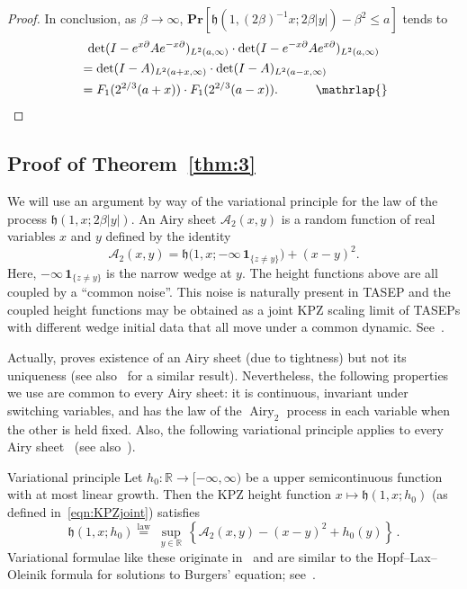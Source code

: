 \documentclass[AHL,Unicode,longabstracts]{cedram}
\DeclareMathOperator{\airy}{Airy}
\newcommand{\pr}[1]{\mathbf{Pr}\left[#1\right]}
\newcommand{\ind}[1]{\mathbf{1}_{\{ #1 \}}}
\newcommand{\R}{\mathbb{R}}
\newcommand{\A}{\mathcal{A}}
\newcommand{\h}{\mathfrak{h}}
\begin{document}
\begin{proof}
In conclusion, as $\beta \to \infty$, $\pr{\h(1,(2\beta)^{-1}x; 2\beta |y|) - \beta^2 \leq a}$ tends to
\begin{multline*}
\det(I - e^{x \partial} A e^{-x\partial})_{L^2(a,\infty)} \cdot \det(I - e^{-x \partial} A e^{x\partial})_{L^2(a,\infty)}\\
\begin{aligned}
&= \det(I - A)_{L^2(a+x,\infty)} \cdot \det(I - A)_{L^2(a-x,\infty)}\;\;\\
&= F_1(2^{2/3}(a+x))\cdot F_1(2^{2/3}(a-x)).\mkern 54mu\mathrlap{\qed}
\end{aligned}
\end{multline*}
\let\qed\relax
\end{proof}

\subsection{Proof of Theorem~\ref{thm:3}} \label{sec:thm3}

We will use an argument by way of the variational principle for the law of the process $\h(1,x; 2\beta |y|)$. An Airy sheet $\A_2(x,y)$ is a random function of real variables $x$ and $y$ defined by the identity
\[
\A_2(x,y) = \h \big (1,x; - \infty \, \ind{z \neq y} \big) + (x-y)^2.
\]
Here, $- \infty \,\ind{z \neq y}$ is the narrow wedge at $y$. The height functions above are all coupled by a ``common noise''. This noise is naturally present in TASEP and the coupled height functions may be obtained as a joint KPZ scaling limit of TASEPs with different wedge initial data that all move under a common dynamic. See~\cite[Section~4.5]{MQR}.

Actually, \cite{MQR} proves existence of an Airy sheet (due to tightness) but not its uniqueness (see also~\cite{P} for a similar result). Nevertheless, the following properties we use are common to every Airy sheet: it is continuous, invariant under switching variables, and has the law of the $\airy_2$ process in each variable when the other is held fixed. Also, the following variational principle applies to every Airy sheet~\cite[Theorem~4.18]{MQR} (see also~\cite{CQR2}).

\begin{enonce*}[remark]{Variational principle}
Let $h_0 : \R \to [-\infty, \infty)$ be a upper semicontinuous function with at most linear growth. Then the KPZ height function $x \mapsto \h(1,x; h_0)$ (as defined in~\eqref{eqn:KPZjoint}) satisfies
\[
\h(1,x; h_0) \overset{\text{law}}{=} \; \sup_{y \in \R}\, \left \{ \A_2(x,y) - (x-y)^2 + h_0(y) \right \}\,.
\]
Variational formulae like these originate in~\cite{J} and are similar to the Hopf--Lax--Oleinik formula for solutions to Burgers' equation; see~\cite{CQR2, S3}.
\end{enonce*}
\end{document}
